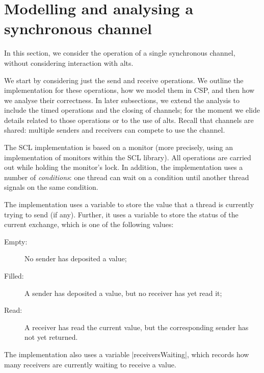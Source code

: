 \section{Modelling and analysing a  synchronous channel}
\label{sec:syncchan}

\inlineScala

In this section, we consider the operation of a single synchronous channel,
without considering interaction with alts.

We start by considering just the send and receive operations.  We outline the
implementation for these operations, how we model them in CSP, and then how we
analyse their correctness.  In later subsections, we extend the analysis to
include the timed operations and the closing of channels; for the moment we
elide details related to those operations or to the use of alts.  Recall that
channels are shared: multiple senders and receivers can compete to use the
channel.

The SCL implementation is based on a monitor (more precisely, using an
implementation of monitors within the SCL library).  All operations are
carried out while holding the monitor's lock.  In addition, the implementation
uses a number of \emph{conditions}: one thread can wait on a condition until
another thread signals on the same condition.

The implementation uses a variable  to store the value that a
thread is currently trying to send (if any).  Further, it uses a variable
 to store the status of the current exchange, which is one of
the following values:
%
\begin{description}
\item[{\scalastyle Empty}:] No sender has deposited a value;
\item[{\scalastyle Filled}:] A sender has deposited a value, but no receiver
  has yet read it;
\item[{\scalastyle Read}:] A receiver has read the current value, but the
  corresponding sender has not yet returned.
\end{description}
%
The implementation also uses a variable |receiversWaiting|, which records how
many receivers are currently waiting to receive a value. 


